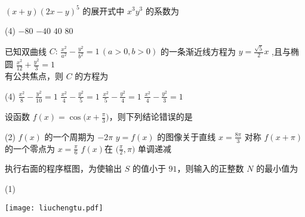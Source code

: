 \documentclass[11pt,space]{ctexart} %
\begin{document}
\begin{enumerate}[itemsep=0.2em,topsep=0pt]
	\item $(x+y)(2x-y)^5$ 的展开式中 $x^3y^3$ 的系数为 
	\begin{tasks}(4)
		\task $-80$ \task $-40$ \task $40$ \task $80$ 
	\end{tasks}
	\item 已知双曲线 $C\colon\,\tfrac{x^2}{a^2}-\tfrac{y^2}{b^2}=1\,(a>0,b>0)$ 的一条渐近线方程为 $y=\tfrac{\sqrt{5}}{2}x$ ,且与椭圆
	$\tfrac{x^2}{12}+\tfrac{y^2}{3}=1$\\ 有公共焦点，则 $C$ 的方程为
	\begin{tasks}(4)
		\task $\frac{x^2}{8}-\frac{y^2}{10}=1$ \task $\frac{x^2}{4}-\frac{y^2}{5}=1$ \task $\frac{x^2}{5}-\frac{y^2}{4}=1$ \task $\frac{x^2}{4}-\frac{y^2}{3}=1$ 
	\end{tasks}
	\item 设函数 $f(x)=\cos\big(x+\tfrac{\pi}{3}\big)$，则下列结论错误的是
	\begin{tasks}(2)
		\task $f(x)$ 的一个周期为 $-2\pi$ \task $y=f(x)$ 的图像关于直线 $x=\frac{8\pi}{3}$ 对称
		\task $f(x+\pi)$ 的一个零点为 $x=\frac{\pi}{6}$ \task  $f(x)$在 $\Big(\frac{\pi}{2},\pi\Big)$ 单调递减 
	\end{tasks}
	\begin{minipage}[h][10ex][t]{.22\textwidth}\item 执行右面的程序框图，为使输出 $S$ 的值小于 $91$，则输入的正整数 $N$ 的最小值为
		\begin{tasks}(1)
			    
	\end{tasks}\end{minipage}
	\begin{minipage}[h][20ex][t]{.25\textwidth}\vspace{3em}
		\texttt{[image: liuchengtu.pdf]}
	\end{minipage}\vspace{12em}
	

\end{enumerate}
\end{document}
